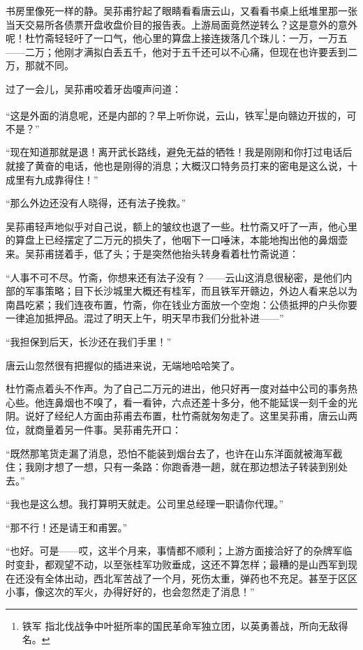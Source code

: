 \par 书房里像死一样的静。吴荪甫狞起了眼睛看看唐云山，又看看书桌上纸堆里那一张当天交易所各债票开盘收盘价目的报告表。上游局面竟然逆转么？这是意外的意外呢！杜竹斋轻轻吁了一口气，他心里的算盘上接连拨落几个珠儿：一万，一万五——二万；他刚才满拟白丢五千，他对于五千还可以不心痛，但现在也许要丢到二万，那就不同。
\par 过了一会儿，吴荪甫咬着牙齿嗄声问道：
\par “这是外面的消息呢，还是内部的？早上听你说，云山，铁军\footnote{铁军 指北伐战争中叶挺所率的国民革命军独立团，以英勇善战，所向无敌得名。}是向赣边开拔的，可不是？”
\par “现在知道那就是退！离开武长路线，避免无益的牺牲！我是刚刚和你打过电话后就接了黄奋的电话，他也是刚得的消息；大概汉口特务员打来的密电是这么说，十成里有九成靠得住！”
\par “那么外边还没有人晓得，还有法子挽救。”
\par 吴荪甫轻声地似乎对自己说，额上的皱纹也退了一些。杜竹斋又吁了一声，他心里的算盘上已经摆定了二万元的损失了，他咽下一口唾沫，本能地掏出他的鼻烟壶来。吴荪甫搓着手，低了头；于是突然他抬头转身看着杜竹斋说道：
\par “人事不可不尽。竹斋，你想来还有法子没有？——云山这消息很秘密，是他们内部的军事策略；目下长沙城里大概还有桂军，而且铁军开赣边，外边人看来总以为南昌吃紧；我们连夜布置，竹斋，你在钱业方面放一个空炮：公债抵押的户头你要一律追加抵押品。混过了明天上午，明天早市我们分批补进——”
\par “我担保到后天，长沙还在我们手里！”
\par 唐云山忽然很有把握似的插进来说，无端地哈哈笑了。
\par 杜竹斋点着头不作声。为了自己二万元的进出，他只好再一度对益中公司的事务热心些。他连鼻烟也不嗅了，看一看钟，六点还差十多分，他不能延误一刻千金的光阴。说好了经纪人方面由荪甫去布置，杜竹斋就匆匆走了。这里吴荪甫，唐云山两位，就商量着另一件事。吴荪甫先开口：
\par “既然那笔货走漏了消息，恐怕不能装到烟台去了，也许在山东洋面就被海军截住；我刚才想了一想，只有一条路：你跑香港一趟，就在那边想法子转装到别处去。”
\par “我也是这么想。我打算明天就走。公司里总经理一职请你代理。”
\par “那不行！还是请王和甫罢。”
\par “也好。可是——哎，这半个月来，事情都不顺利；上游方面接洽好了的杂牌军临时变卦，都观望不动，以至张桂军功败垂成，这还不算怎样；最糟的是山西军到现在还没有全体出动，西北军苦战了一个月，死伤太重，弹药也不充足。甚至于区区小事，像这次的军火，办得好好的，也会忽然走了消息！”
